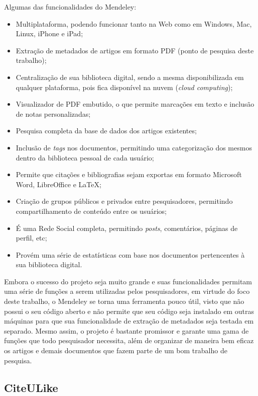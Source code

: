 Algumas das funcionalidades do Mendeley:

\begin{itemize}
    \item Multiplataforma, podendo funcionar tanto na Web como em Windows, Mac, Linux, iPhone e iPad;
    \item Extração de metadados de artigos em formato PDF (ponto de pesquisa deste trabalho);
    \item Centralização de sua biblioteca digital, sendo a mesma disponibilizada em qualquer plataforma, pois fica disponível na nuvem (\emph{cloud computing});
    \item Visualizador de PDF embutido, o que permite marcações em texto e inclusão de notas personalizadas;
    \item Pesquisa completa da base de dados dos artigos existentes;
    \item Inclusão de \emph{tags} nos documentos, permitindo uma categorização dos mesmos dentro da biblioteca pessoal de cada usuário;
    \item Permite que citações e bibliografias sejam exportas em formato Microsoft Word, LibreOffice e \LaTeX;
    \item Criação de grupos públicos e privados entre pesquisadores, permitindo compartilhamento de conteúdo entre os usuários;
    \item É uma Rede Social completa, permitindo \emph{posts}, comentários, páginas de perfil, etc;
    \item Provém uma série de estatísticas com base nos documentos pertencentes à sua biblioteca digital.
\end{itemize}


Embora o sucesso do projeto seja muito grande e suas funcionalidades permitam uma série de funções a serem utilizadas pelos pesquisadores, em virtude do foco deste trabalho, o Mendeley se torna uma ferramenta pouco útil, visto que não possui o seu código aberto e não permite que seu código seja instalado em outras máquinas para que sua funcionalidade de extração de metadados seja testada em separado. Mesmo assim, o projeto é bastante promissor e garante uma gama de funções que todo pesquisador necessita, além de organizar de maneira bem eficaz os artigos e demais documentos que fazem parte de um bom trabalho de pesquisa.

\subsection{CiteULike}
\label{ssec:citeulike}

